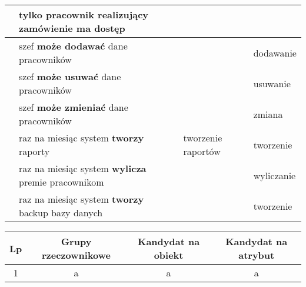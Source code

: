\documentclass[a4page]{article}
\begin{document}
\begin{table}[tp!]
\begin{adjustwidth}{-4.5cm}{}
\begin{tabular}{|l|l|l|l|}
					\nextrow & tylko pracownik realizujący zamówienie \textbf{ma} dostęp &  & \\
				\hline
					\nextrow & szef \textbf{może dodawać} dane pracowników &  & dodawanie\\
				\hline
					\nextrow & szef \textbf{może usuwać} dane pracowników &  & usuwanie\\
				\hline
					\nextrow & szef \textbf{może zmieniać} dane pracowników &  & zmiana\\
				\hline
					\nextrow & raz na miesiąc system \textbf{tworzy} raporty & tworzenie raportów & tworzenie\\
				\hline
					\nextrow & raz na miesiąc system \textbf{wylicza} premie pracownikom &  & wyliczanie\\
				\hline
					\nextrow & raz na miesiąc system \textbf{tworzy} backup bazy danych &  & tworzenie\\
				\hline
	
			\end{tabular}
		\end{adjustwidth}
	\end{table}

	\newpage

	\begin{table}
		\large

		\begin{tabular}{|c|c|c|c|}
		
			\hline
				Lp & Grupy rzeczownikowe & Kandydat na obiekt & Kandydat na atrybut\\
			\hline
				1 & a & a & a\\
			\hline

		\end{tabular}
	\end{table}
\end{document}
